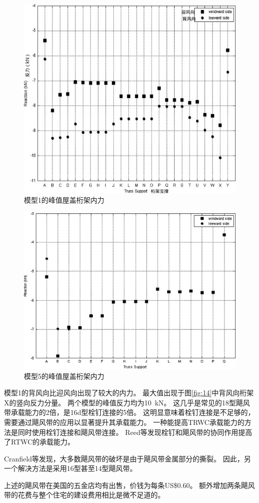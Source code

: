 \documentclass{ctexart}
\begin{document}
\begin{figure}
\centering
\includegraphics{./fig/15.jpg}
\caption{模型1的峰值屋盖桁架内力}
\label{fig:15}
\end{figure}

\begin{figure}
\centering
\includegraphics{./fig/16.jpg}
\caption{模型5的峰值屋盖桁架内力}
\label{fig:16}
\end{figure}



模型1的背风向比迎风向出现了较大的内力。
最大值出现于图\ref{fig:14}中背风向桁架X的竖向反力分量。
两个模型的峰值反力均为\SI{10}{kN}。
这几乎是常见的18型飓风带承载能力的2倍\cite{canfield1991uplift}，是16d型栓钉连接的5倍。
这明显意味着栓钉连接是不足够的，需要通过飓风带的应用以显著提升其承载能力。
一种能提高TRWC承载能力的方法是同时使用栓钉连接和飓风带连接。
Reed等\cite{reed1997uplift}发现栓钉和飓风带的协同作用提高了RTWC的承载能力。

Cranfield等\cite{canfield1991uplift}发现，大多数飓风带的破坏是由于飓风带金属部分的撕裂。
因此，另一个解决方法是采用16型甚至14型飓风带。

上述的飓风带在美国的五金店均有出售，价钱为每条US\$0.60。
额外增加两条飓风带的花费与整个住宅的建设费用相比是微不足道的。 	

\printbibliography
\end{document}
